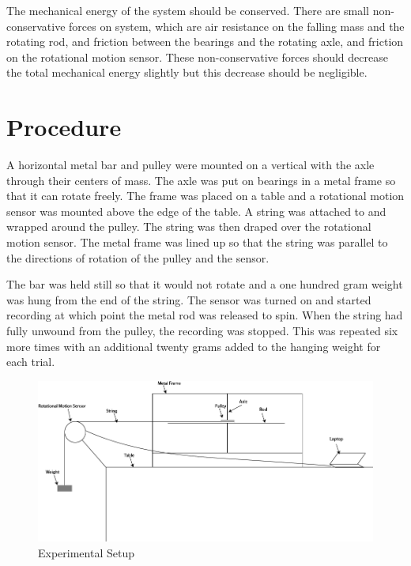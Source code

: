 \documentclass[12pt]{article}
\begin{document}
        The mechanical energy of the system should be conserved. There are small non-conservative forces on system, which are air resistance on the falling mass and the rotating rod, and friction between the bearings and the rotating axle, and friction on the rotational motion sensor. These non-conservative forces should decrease the total mechanical energy slightly but this decrease should be negligible.
    \section{Procedure}
        A horizontal metal bar and pulley were mounted on a vertical with the axle through their centers of mass. The axle was put on bearings in a metal frame so that it can rotate freely. The frame was placed on a table and a rotational motion sensor was mounted above the edge of the table. A string was attached to and wrapped around the pulley. The string was then draped over the rotational motion sensor. The metal frame was lined up so that the string was parallel to the directions of rotation of the pulley and the sensor.

        The bar was held still so that it would not rotate and a one hundred gram weight was hung from the end of the string. The sensor was turned on and started recording at which point the metal rod was released to spin. When the string had fully unwound from the pulley, the recording was stopped. This was repeated six more times with an additional twenty grams added to the hanging weight for each trial.
        \begin{figure}
            \centering
            \includegraphics[width=0.75\linewidth]{Setup.png}
            \caption{Experimental Setup}
        \end{figure}
\end{document}
